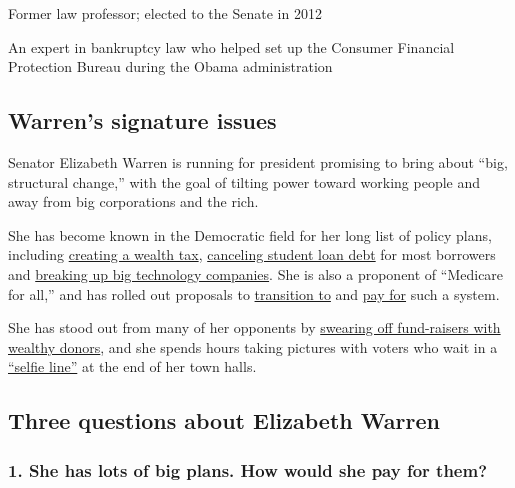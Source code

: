 Former law professor; elected to the Senate in 2012

An expert in bankruptcy law who helped set up the Consumer Financial
Protection Bureau during the Obama administration

\hypertarget{warrens-signature-issues}{%
\subsection{Warren's signature issues}\label{warrens-signature-issues}}

Senator Elizabeth Warren is running for president promising to bring
about ``big, structural change,'' with the goal of tilting power toward
working people and away from big corporations and the rich.

She has become known in the Democratic field for her long list of policy
plans, including
\href{https://www.nytimes.com/2019/02/18/upshot/warren-wealth-tax.html}{creating
a wealth tax},
\href{https://www.nytimes.com/2019/04/22/us/politics/elizabeth-warren-student-debt.html}{canceling
student loan debt} for most borrowers and
\href{https://www.nytimes.com/2019/03/08/us/politics/elizabeth-warren-amazon.html}{breaking
up big technology companies}. She is also a proponent of ``Medicare for
all,'' and has rolled out proposals to
\href{https://www.nytimes.com/2019/11/15/us/politics/elizabeth-warren-medicare-for-all-100-days.html}{transition
to} and
\href{https://www.nytimes.com/2019/11/01/us/politics/elizabeth-warren-medicare-for-all.html}{pay
for} such a system.

She has stood out from many of her opponents by
\href{https://www.nytimes.com/2019/02/25/us/politics/elizabeth-warren-donors-fundraising.html}{swearing
off fund-raisers with wealthy donors}, and she spends hours taking
pictures with voters who wait in a
\href{https://www.nytimes.com/interactive/2019/07/22/us/politics/elizabeth-warren-selfies.html}{``selfie
line''} at the end of her town halls.

\hypertarget{three-questions-about-elizabeth-warren}{%
\subsection{Three questions about Elizabeth
Warren}\label{three-questions-about-elizabeth-warren}}

\hypertarget{1-she-has-lots-of-big-plans-how-would-she-pay-for-them}{%
\subsubsection{\texorpdfstring{\textbf{1. She has lots of big plans. How
would she pay for
them?}}{1. She has lots of big plans. How would she pay for them?}}\label{1-she-has-lots-of-big-plans-how-would-she-pay-for-them}}

